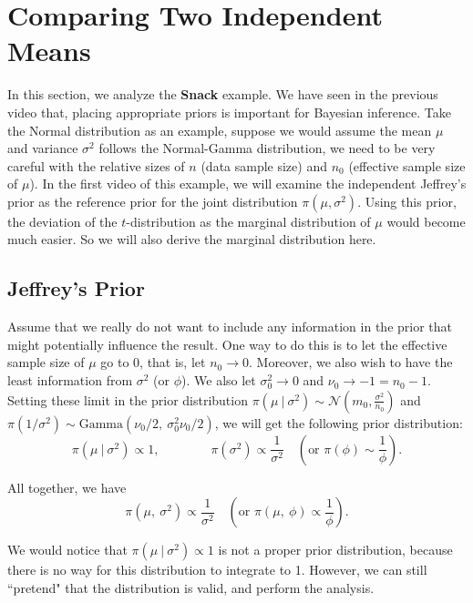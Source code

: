 \documentclass{article}
\begin{document}
\section{Comparing Two Independent Means}

In this section, we analyze the \textbf{Snack} example. We have seen in the previous video that, placing appropriate priors is important for Bayesian inference. Take the Normal distribution as an example, suppose we would assume the mean $\mu$ and variance $\sigma^2$ follows the Normal-Gamma distribution, we need to be very careful with the relative sizes of $n$ (data sample size) and $n_0$ (effective sample size of $\mu$). In the first video of this example, we will examine the independent Jeffrey's prior as the reference prior for the joint distribution $\pi(\mu, \sigma^2)$. Using this prior, the deviation of the $t$-distribution as the marginal distribution of $\mu$ would become much easier. So we will also derive the marginal distribution here.

\subsection{Jeffrey's Prior}

Assume that we really do not want to include any information in the prior that might potentially influence the result. One way to do this is to let the effective sample size of $\mu$ go to 0, that is, let $n_0\rightarrow 0$. Moreover, we also wish to have the least information from $\sigma^2$ (or $\phi$). We also let $\sigma_0^2\rightarrow 0$ and $\nu_0\rightarrow -1 = n_0-1$. \\

Setting these limit in the prior distribution $\pi(\mu~|~\sigma^2) \sim \mathcal{N}(m_0, \frac{\sigma^2}{n_0})$ and $\pi(1/\sigma^2) \sim \text{Gamma}(\nu_0/2,\ \sigma_0^2\nu_0/2)$, we will get the following prior distribution:
$$ \pi(\mu~|~\sigma^2)\propto 1,\qquad \qquad \pi(\sigma^2) \propto \frac{1}{\sigma^2} \quad (\text{or $\pi(\phi) \sim \frac{1}{\phi}$}).$$

All together, we have
$$ \pi(\mu,\ \sigma^2) \propto \frac{1}{\sigma^2} \quad (\text{or $\pi(\mu,\ \phi)\propto \frac{1}{\phi}$}).$$

We would notice that $\pi(\mu~|~\sigma^2)\propto 1$ is not a proper prior distribution, because there is no way for this distribution to integrate to 1. However, we can still ``pretend" that the distribution is valid, and perform the analysis.
\end{document}
